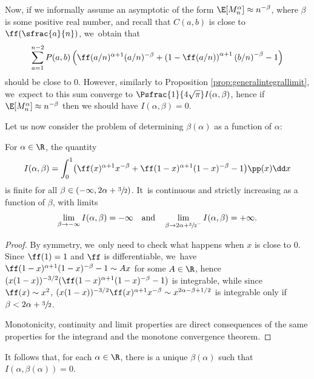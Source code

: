 Now, if we informally assume an asymptotic of the form $\E[M_n^\alpha] \approx n^{-\beta}$, where $\beta$ is some positive real number, and recall that $C(a,b)$ is close to $\ff(\sfrac{a}{n})$, we~obtain that
\[
\sum_{a=1}^{n-2}P(a,b)\left(\ff(a/n)^{\alpha+1} (a/n)^{-\beta}+\left(1-\ff(a/n)\right)^{\alpha+1} \left(b/n\right)^{-\beta}-1\right)
\]
should be close to $0$. However, similarly to Proposition \ref{prop:generalintegrallimit}, we~expect to this sum converge to $\Psfrac{1}{4\sqrt{\pi}} I(\alpha,\beta)$, hence if $\E[M_n^\alpha] \approx n^{-\beta}$ then we should have $I(\alpha,\beta)=0$.

Let us now consider the problem of determining $\beta(\alpha)$ as a function of $\alpha$:
\begin{lem}
For $\alpha\in\R$, the quantity\vspace*{-3pt}
\[
I(\alpha,\beta)=\int_0^1 \bigl(\ff(x)^{\alpha+1} x^{-\beta}+\ff(1-x)^{\alpha+1} (1-x)^{-\beta}-1\bigr)\pp(x)\dd x
\]
is finite for all $\beta \in (-\infty,2\alpha+\sfrac{3}{2})$. It~is continuous and strictly increasing as a function of $\beta$, with limits\vspace*{-3pt}
\[
\lim_{\beta\to -\infty}I(\alpha,\beta)=-\infty\quad\text{and}\quad\lim_{\beta\to2\alpha+\sfrac{3}{2}^-}I(\alpha,\beta)=+\infty.
\]
\end{lem}

\begin{proof}
By symmetry, we~only need to check what happens when $x$ is close to $0$. Since $\ff(1)=1$ and $\ff$ is differentiable, we~have $\ff(1-x)^{\alpha+1} (1-x)^{-\beta}-1 \sim Ax$ for some $A\in\R$, hence $(x(1-x))^{-3/2}(\ff(1-x)^{\alpha+1} (1-x)^{-\beta}-1)$ is integrable, while since $\ff(x)\sim x^2$, $(x(1-x))^{-3/2}\ff(x)^{\alpha+1}x^{-\beta}\sim x^{2\alpha-\beta+1/2}$ is integrable only if $\beta<2\alpha+\sfrac{3}{2}$.

Monotonicity, continuity and limit properties are direct consequences of the same properties for the integrand and the monotone convergence theorem.
\end{proof}

It follows that, for each $\alpha\in\R$, there is a unique $\beta(\alpha)$ such that $I(\alpha,\beta(\alpha))=0$.

